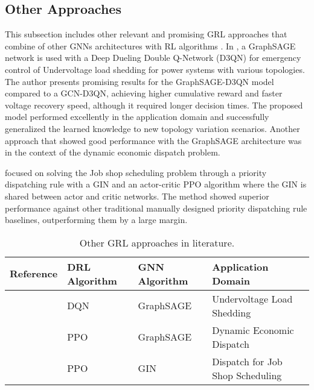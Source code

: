 \subsection{Other Approaches} \label{sec:review-other-gnn}

This subsection includes other relevant and promising \ac{GRL} approaches that combine of other \acp{GNN} architectures with \ac{RL} algorithms . In \cite{peiEmergencyControlStrategy2023}, a GraphSAGE network \cite{hamiltonInductiveRepresentationLearning2018} is used with a Deep Dueling Double Q-Network (D3QN) for emergency control of Undervoltage load shedding for power systems with various topologies. The author presents promising results for the GraphSAGE-D3QN model compared to a GCN-D3QN, achieving higher cumulative reward and faster voltage recovery speed, although it required longer decision times. The proposed model performed excellently in the application domain and successfully generalized the learned knowledge to new topology variation scenarios. Another approach that showed good performance with the GraphSAGE architecture was \cite{zhaoGraphbasedDeepReinforcement2022} in the context of the dynamic economic dispatch problem. \par
\cite{zhangLearningDispatchJob2020} focused on solving the Job shop scheduling problem through a priority dispatching rule with a \ac{GIN} \cite{xuHowPowerfulAre2019} and an actor-critic \ac{PPO} algorithm where the \ac{GIN} is shared between actor and critic networks. The method showed superior performance against other traditional manually designed priority dispatching rule baselines, outperforming them by a large margin.

\begin{table}[H] 
	\centering
	\caption{Other \acs{GRL} approaches in literature.}
	\begin{tabular}{P{2cm}P{2cm}P{2cm}p{5cm}}
		\toprule
		\textbf{Reference} & \textbf{DRL Algorithm} & \textbf{GNN Algorithm} & \textbf{Application Domain} \\
		\midrule
		\cite{peiEmergencyControlStrategy2023} & DQN & GraphSAGE & Undervoltage Load Shedding  \\ 
		\cite{zhaoGraphbasedDeepReinforcement2022} & PPO & GraphSAGE  & Dynamic Economic Dispatch \\ 
		\cite{zhangLearningDispatchJob2020} & PPO & GIN & Dispatch for Job Shop Scheduling \\ 
		\bottomrule
	\end{tabular}
	\label{tab:other-lit}
\end{table}

